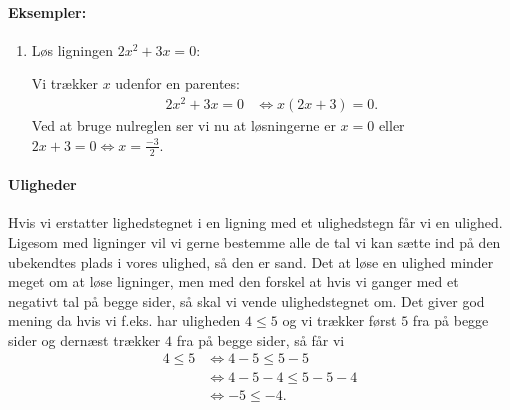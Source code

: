 \paragraph*{Eksempler:}
\begin{enumerate}
\item Løs ligningen $2x^2+3x=0$:

Vi trækker $x$ udenfor en parentes:
\begin{align*}
2x^2+3x=0 &\Leftrightarrow x(2x+3)=0.
\end{align*}
Ved at bruge nulreglen ser vi nu at løsningerne er $x=0$ eller $2x+3=0 \Leftrightarrow x = \frac{-3}{2}$.
\end{enumerate}

\paragraph*{Uligheder}
Hvis vi erstatter lighedstegnet i en ligning med et ulighedstegn får vi en ulighed. Ligesom med ligninger vil vi gerne bestemme alle de tal vi kan sætte ind på den ubekendtes plads i vores ulighed, så den er sand. Det at løse en ulighed minder meget om at løse ligninger, men med den forskel at hvis vi ganger med et negativt tal på begge sider, så skal vi vende ulighedstegnet om. Det giver god mening da hvis vi f.eks. har uligheden $4 \leq 5$ og vi trækker først $5$ fra på begge sider og dernæst trækker $4$ fra på begge sider, så får vi
\begin{align*}
4 \leq 5 &\Leftrightarrow 4 - 5 \leq 5 - 5 \\
&\Leftrightarrow 4 - 5 - 4 \leq 5 - 5 - 4 \\
&\Leftrightarrow -5 \leq -4. 
\end{align*} 

